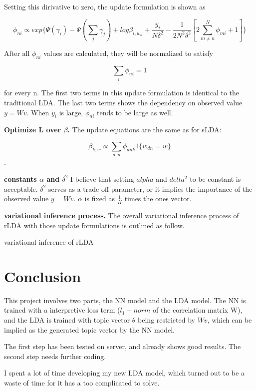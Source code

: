 \documentclass[12pt,a4paper]{ctexart}
\begin{document}
Setting this dirivative to zero, the update formulation is shown as

$$\phi_{ni} \propto exp\{ \Psi(\gamma_i) - \Psi(\sum_{j}\gamma_j) + log\beta_{i,w_n} + \frac{y_i}{N\delta^2} -\frac{1}{2N^2\delta^2}[2\sum_{m \neq n}^{N}{\phi_{mi}} + 1] \}$$

After all $\phi_{ni}$ values are calculated, they will be normalized to satisfy

$$\sum_{i}{\phi_{ni}} = 1$$

for every n. The first two terms in this update formulation is identical to the traditional LDA. The last two terms shows the dependency on observed value $y=Wv$. When $y_i$ is large, $\phi_{ni}$ tends to be large as well.

\textbf{Optimize L over $\beta$.} The update equations are the same as for sLDA:

$$\beta_{k,w} \propto \sum_{d, n}\phi_{dnk}1\{w_{dn} = w\}$$.

\textbf{constants $\alpha$ and $\delta^2$} I believe that setting $alpha$ and $delta^2$ to be constant is acceptable. $\delta^2$ serves as a trade-off parameter, or it implies the importance of the observed value $y=Wv$. $\alpha$ is fixed as $\frac{1}{K}$ times the ones vector.

\textbf{variational inference process.} The overall variational inference process of rLDA with those update formulations is outlined as follow.

\begin{algorithm}
	\caption{variational inference of rLDA}
\end{algorithm}

\section{Conclusion}

This project involves two parts, the NN model and the LDA model. The NN is trained with a interpretive loss term ($l_1-norm$ of the correlation matrix W), and the LDA is trained with topic vector $\theta$ being restricted by $Wv$, which can be implied as the generated topic vector by the NN model.

The first step has been tested on server, and already shows good results. The second step needs further coding.

I spent a lot of time developing my new LDA model, which turned out to be a waste of time for it has a too complicated to solve.
\end{document}
